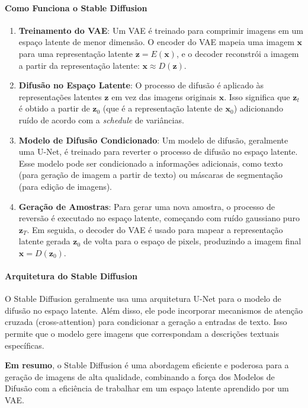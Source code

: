 \documentclass{tufte-handout}
\begin{document}
\paragraph{Como Funciona o Stable Diffusion}

\begin{enumerate}
    \item \textbf{Treinamento do VAE}: Um VAE é treinado para comprimir imagens em um espaço latente de menor dimensão. O encoder do VAE mapeia uma imagem $\mathbf{x}$ para uma representação latente $\mathbf{z} = E(\mathbf{x})$, e o decoder reconstrói a imagem a partir da representação latente: $\mathbf{x} \approx D(\mathbf{z})$.
    \item \textbf{Difusão no Espaço Latente}: O processo de difusão é aplicado às representações latentes $\mathbf{z}$ em vez das imagens originais $\mathbf{x}$. Isso significa que $\mathbf{z}_t$ é obtido a partir de $\mathbf{z}_0$ (que é a representação latente de $\mathbf{x}_0$) adicionando ruído de acordo com a \textit{schedule} de variâncias.
    \item \textbf{Modelo de Difusão Condicionado}: Um modelo de difusão, geralmente uma U-Net, é treinado para reverter o processo de difusão no espaço latente. Esse modelo pode ser condicionado a informações adicionais, como texto (para geração de imagem a partir de texto) ou máscaras de segmentação (para edição de imagens).
    \item \textbf{Geração de Amostras}: Para gerar uma nova amostra, o processo de reversão é executado no espaço latente, começando com ruído gaussiano puro $\mathbf{z}_T$. Em seguida, o decoder do VAE é usado para mapear a representação latente gerada $\mathbf{z}_0$ de volta para o espaço de pixels, produzindo a imagem final $\mathbf{x} = D(\mathbf{z}_0)$.
\end{enumerate}

\paragraph{Arquitetura do Stable Diffusion}

O Stable Diffusion geralmente usa uma arquitetura U-Net para o modelo de difusão no espaço latente. Além disso, ele pode incorporar mecanismos de atenção cruzada (cross-attention) para condicionar a geração a entradas de texto. Isso permite que o modelo gere imagens que correspondam a descrições textuais específicas.

\textbf{Em resumo}, o Stable Diffusion é uma abordagem eficiente e poderosa para a geração de imagens de alta qualidade, combinando a força dos Modelos de Difusão com a eficiência de trabalhar em um espaço latente aprendido por um VAE.
\end{document}
